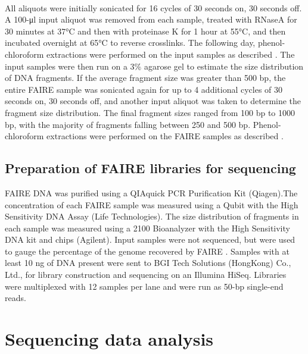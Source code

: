 \paragraph{}
All aliquots were initially sonicated for 16 cycles of 30 seconds on, 30 seconds off. A 100-μl input aliquot was removed from each sample, treated with RNaseA for 30 minutes at 37°C and then with proteinase K for 1 hour at 55°C, and then incubated overnight at 65°C to reverse crosslinks. The following day, phenol-chloroform extractions were performed on the input samples as described \citep{simon_using_2012}. The input samples were then run on a 3\% agarose gel to estimate the size distribution of DNA fragments. If the average fragment size was greater than 500 bp, the entire FAIRE sample was sonicated again for up to 4 additional cycles of 30 seconds on, 30 seconds off, and another input aliquot was taken to determine the fragment size distribution. The final fragment sizes ranged from 100 bp to 1000 bp, with the majority of fragments falling between 250 and 500 bp. Phenol-chloroform extractions were performed on the FAIRE samples as described \citep{simon_using_2012}.

\subsection{Preparation of FAIRE libraries for sequencing}
FAIRE DNA was purified using a QIAquick PCR Purification Kit (Qiagen).The concentration of each FAIRE sample was measured using a Qubit with the High Sensitivity DNA Assay (Life Technologies). The size distribution of fragments in each sample was measured using a 2100 Bioanalyzer with the High Sensitivity DNA kit and chips (Agilent). Input samples were not sequenced, but were used to gauge the percentage of the genome recovered by FAIRE \citep{simon_using_2012}. Samples with at least 10 ng of DNA present were sent to BGI Tech Solutions (HongKong) Co., Ltd., for library construction and sequencing on an Illumina HiSeq. Libraries were multiplexed with 12 samples per lane and were run as 50-bp single-end reads.

\section{Sequencing data analysis} 

